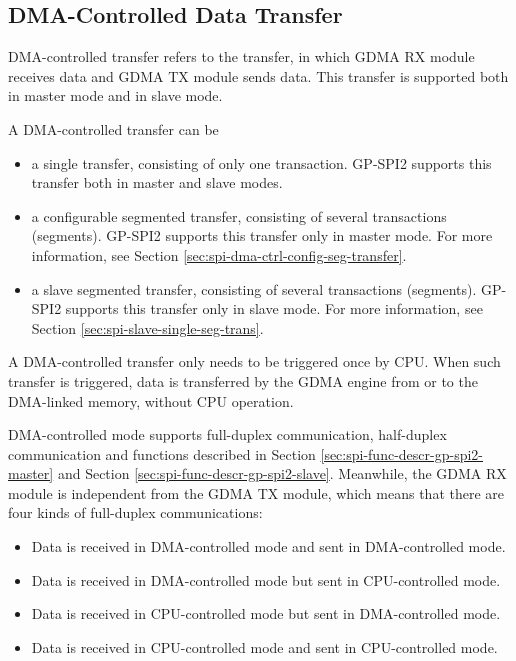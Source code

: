 \documentclass[main\_\_EN.tex]{subfiles}
\begin{document}
\subsection{DMA-Controlled Data Transfer}\label{sec:spi-func-descr-dma-ctrl-data-transfer}

DMA-controlled transfer refers to the transfer, in which GDMA RX module receives data and GDMA TX module sends data. This transfer is supported both in master mode and in slave mode.

A DMA-controlled transfer can be

\begin{itemize}
    \item a single transfer, consisting of only one transaction. GP-SPI2 supports this transfer both in master and slave modes.
    \item a configurable segmented transfer, consisting of several transactions (segments). GP-SPI2 supports this transfer only in master mode. For more information, see Section \ref{sec:spi-dma-ctrl-config-seg-transfer}.
    \item a slave segmented transfer, consisting of several transactions (segments). GP-SPI2 supports this transfer only in slave mode. For more information, see Section \ref{sec:spi-slave-single-seg-trans}.
\end{itemize}

A DMA-controlled transfer only needs to be triggered once by CPU. When such transfer is triggered, data is transferred by the GDMA engine from or to the DMA-linked memory, without CPU operation.

DMA-controlled mode supports full-duplex communication, half-duplex communication and functions described in Section \ref{sec:spi-func-descr-gp-spi2-master} and Section \ref{sec:spi-func-descr-gp-spi2-slave}. Meanwhile, the GDMA RX module is independent from the GDMA TX module, which means that there are four kinds of full-duplex communications:

\begin{itemize}
    \item Data is received in DMA-controlled mode and sent in DMA-controlled mode.

    \item Data is received in DMA-controlled mode but sent in CPU-controlled mode.

    \item Data is received in CPU-controlled mode but sent in DMA-controlled mode.

    \item Data is received in CPU-controlled mode and sent in CPU-controlled mode.

\end{itemize}
\end{document}
